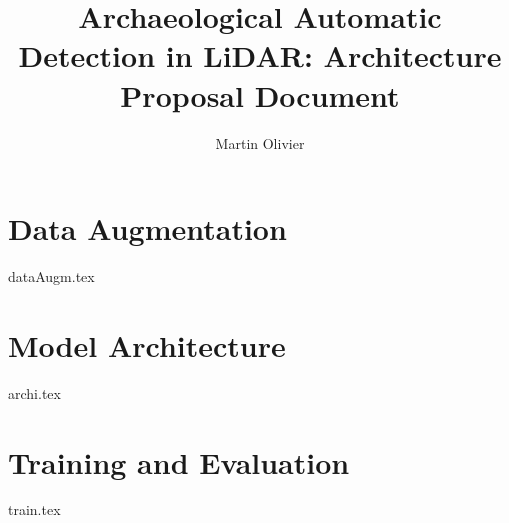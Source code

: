 \documentclass[a4paper, 12pt, titlepage, oneside]{article}
\author{Martin Olivier}
\title{Archaeological Automatic Detection in LiDAR: Architecture Proposal Document}
\begin{document}
\maketitle

\tableofcontents

\newpage
\section{Data Augmentation}
{dataAugm.tex}
\newpage

\section{Model Architecture}
{archi.tex}
\newpage

\section{Training and Evaluation}
{train.tex}
\newpage
\end{document}
